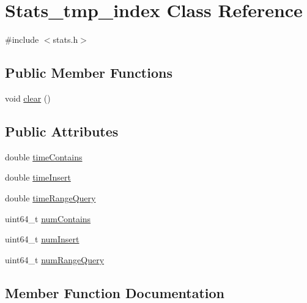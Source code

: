 \hypertarget{classStats__tmp__index}{}\section{Stats\+\_\+tmp\+\_\+index Class Reference}
\label{classStats__tmp__index}


{\ttfamily \#include $<$stats.\+h$>$}

\subsection*{Public Member Functions}
\begin{DoxyCompactItemize}
\item 
void \hyperlink{classStats__tmp__index_a09d71fb6d20ef59128982427ee816cd8}{clear} ()
\end{DoxyCompactItemize}
\subsection*{Public Attributes}
\begin{DoxyCompactItemize}
\item 
double \hyperlink{classStats__tmp__index_a9c94ac12e843f81d2b11659520dac58e}{time\+Contains}
\item 
double \hyperlink{classStats__tmp__index_a143a1d4977ca5db4c120bc72bcb984c8}{time\+Insert}
\item 
double \hyperlink{classStats__tmp__index_a09874517340c9d236d5bdbd999131403}{time\+Range\+Query}
\item 
uint64\+\_\+t \hyperlink{classStats__tmp__index_a6f9644823781c0d9d1fba3e0fb75e521}{num\+Contains}
\item 
uint64\+\_\+t \hyperlink{classStats__tmp__index_ab2d59b278ef4ae7f64b703d163a75a31}{num\+Insert}
\item 
uint64\+\_\+t \hyperlink{classStats__tmp__index_a4f5dcc0a7691ea81826c433b446d67f5}{num\+Range\+Query}
\end{DoxyCompactItemize}


\subsection{Member Function Documentation}
\mbox{\label{classStats__tmp__index_a09d71fb6d20ef59128982427ee816cd8}} 
